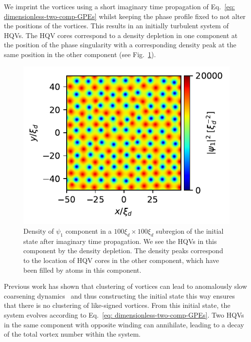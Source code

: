 We imprint the vortices using a short imaginary time propagation of
Eq.~\eqref{eq: dimensionless-two-comp-GPEs} whilst keeping the phase profile
fixed to not alter the positions of the vortices.
This results in an initially turbulent system of HQVs.
The HQV cores correspond to a density depletion in one component at the position
of the phase singularity with a corresponding density peak at the same position
in the other component (see Fig.~\ref{fig:initial-vortex-state}).
\begin{figure}
    \centering
    \includegraphics{gfx/ch-twoCompDynamics/init_state.pdf}
    \caption{Density of \(\psi_1 \) component in a \(100\xi_d\times100\xi_d\)
    subregion of the initial state after imaginary time propagation.
    We see the HQVs in this component by the density depletion.
    The density peaks correspond to the location of HQV cores in the other
    component, which have been filled by atoms in this
    component.\label{fig:initial-vortex-state}}
\end{figure}

Previous work has shown that clustering of vortices can lead to anomalously
slow coarsening dynamics~\cite{Karl2017} and thus constructing the initial
state this way ensures that there is no clustering of like-signed vortices.
From this initial state, the system evolves according to
Eq.~\eqref{eq: dimensionless-two-comp-GPEs}.
Two HQVs in the same component with opposite winding can annihilate, leading to
a decay of the total vortex number within the system.

